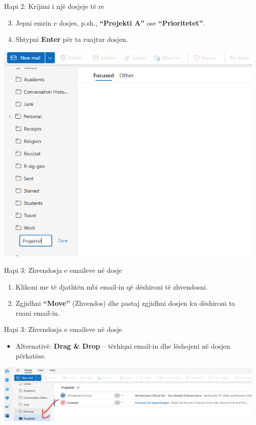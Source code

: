 \documentclass[
  ignorenonframetext,
]{beamer}
\providecommand{\tightlist}{%
  \setlength{\itemsep}{0pt}\setlength{\parskip}{0pt}}
\begin{document}
\begin{frame}{Hapi 2: Krijimi i një dosjeje të re}
\label{hapi-2-krijimi-i-njuxeb-dosjeje-tuxeb-re-1}
\begin{enumerate}
\setcounter{enumi}{2}
\item
  Jepni emrin e dosjes, p.sh., \textbf{``Projekti A''} ose
  \textbf{``Prioritetet''}.
\item
  Shtypni \textbf{Enter} për ta ruajtur dosjen.
\end{enumerate}

\includegraphics{./images/outlook13.png}
\end{frame}

\begin{frame}{Hapi 3: Zhvendosja e emaileve në dosje}
\label{hapi-3-zhvendosja-e-emaileve-nuxeb-dosje}
\begin{enumerate}
\item
  Klikoni me të djathtën mbi email-in që dëshironi të zhvendosni.
\item
  Zgjidhni \textbf{``Move''} (Zhvendos) dhe pastaj zgjidhni dosjen ku
  dëshironi ta ruani email-in.
\end{enumerate}
\end{frame}

\begin{frame}{Hapi 3: Zhvendosja e emaileve në dosje}
\label{hapi-3-zhvendosja-e-emaileve-nuxeb-dosje-1}
\begin{itemize}
\tightlist
\item
  Alternativë: \textbf{Drag \& Drop} -- tërhiqni email-in dhe lëshojeni
  në dosjen përkatëse.
\end{itemize}

\includegraphics{./images/outlook14.png}
\end{frame}
\end{document}
